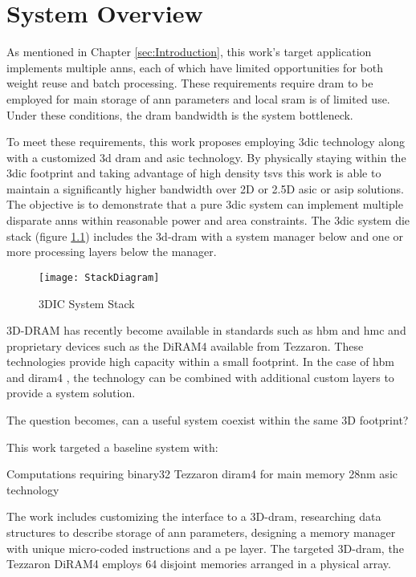 



\chapter{System Overview}
\label{chap-five}
\label{sec:System Overview}
As mentioned in Chapter \ref{sec:Introduction}, this work's target application implements multiple \acp{ann}, each of which have limited opportunities for both weight reuse and batch processing.
These requirements require \ac{dram} to be employed for main storage of \ac{ann} parameters and local \ac{sram} is of limited use.
Under these conditions, the \ac{dram} bandwidth is the system bottleneck.

To meet these requirements, this work proposes employing \ac{3dic} technology along with a customized \ac{3d} \ac{dram} and \ac{asic} technology. 
By physically staying within the \ac{3dic} footprint and taking advantage of high density \acp{tsv} this work is able to maintain a significantly higher bandwidth over 2D or 2.5D \ac{asic} or \ac{asip} solutions.
The objective is to demonstrate that a pure \ac{3dic} system can implement multiple disparate \acp{ann} within reasonable power and area constraints. 
The \ac{3dic} system die stack (figure \ref{fig:3DICStack}) includes the \ac{3d}-\ac{dram} with a system manager below and one or more processing layers below the manager.
\begin{figure}[!t]
\centering
\captionsetup{justification=centering}
\captionsetup{width=.9\linewidth}
\centerline{
\mbox{\texttt{[image: StackDiagram]}}
}
\caption{3DIC System Stack}
\label{fig:3DICStack}
\end{figure}

3D-DRAM has recently become available in standards such as \ac{hbm} and \ac{hmc} and proprietary devices such as the DiRAM4 available from Tezzaron. 
These technologies provide high capacity within a small footprint.
In the case of \ac{hbm} and \ac{diram4} \cite{tezzaron:diram4}, the technology can be combined with additional custom layers to provide a system solution.

The question becomes, can a useful system coexist within the same 3D footprint?

This work targeted a baseline system with:
\begin{outline}
  \1 Computations requiring \ac{binary32}
  \1 Tezzaron \acf{diram4} \cite{tezzaron:diram4} for main memory
  \1 28nm \ac{asic} technology
\end{outline}
The work includes customizing the interface to a 3D-\ac{dram}, researching data structures to describe storage of \ac{ann} parameters, designing a memory manager with unique micro-coded instructions and a \ac{pe} layer.  
The targeted 3D-\ac{dram}, the Tezzaron DiRAM4 employs 64 disjoint memories arranged in a physical array.


